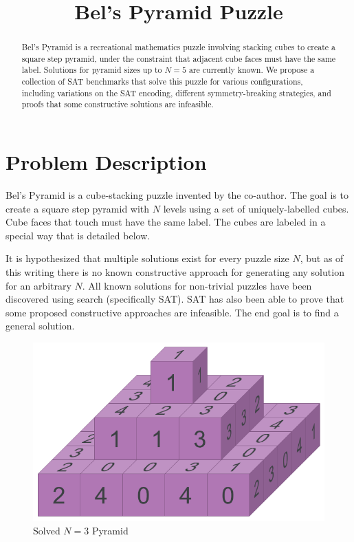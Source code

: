 \documentclass[conference]{IEEEtran}
\begin{document}
\title{Bel's Pyramid Puzzle}

\author{
\and
{}
}

\maketitle

\begin{abstract}
Bel's Pyramid is a recreational mathematics puzzle involving stacking cubes to create a square step pyramid,
under the constraint that adjacent cube faces must have the same label.
Solutions for pyramid sizes up to $N=5$ are currently known.
We propose a collection of SAT benchmarks that solve this puzzle for various configurations,
including variations on the SAT encoding, different symmetry-breaking strategies, and proofs
that some constructive solutions are infeasible.
\end{abstract}

\section{Problem Description}
Bel's Pyramid is a cube-stacking puzzle invented by the co-author.
The goal is to create a square step pyramid with $N$ levels using a set of uniquely-labelled cubes.
Cube faces that touch must have the same label.
The cubes are labeled in a special way that is detailed below.

It is hypothesized that multiple solutions exist for every puzzle size $N$, but as of this writing there is no known
constructive approach for generating any solution for an arbitrary $N$.
All known solutions for non-trivial puzzles have been discovered using search (specifically SAT).
SAT has also been able to prove that some proposed constructive approaches are infeasible.
The end goal is to find a general solution.

\begin{figure}[htbp]
\centerline{\includegraphics[width=\linewidth]{example.png}}
\caption{Solved $N=3$ Pyramid}
\label{example}
\end{figure}
\end{document}
